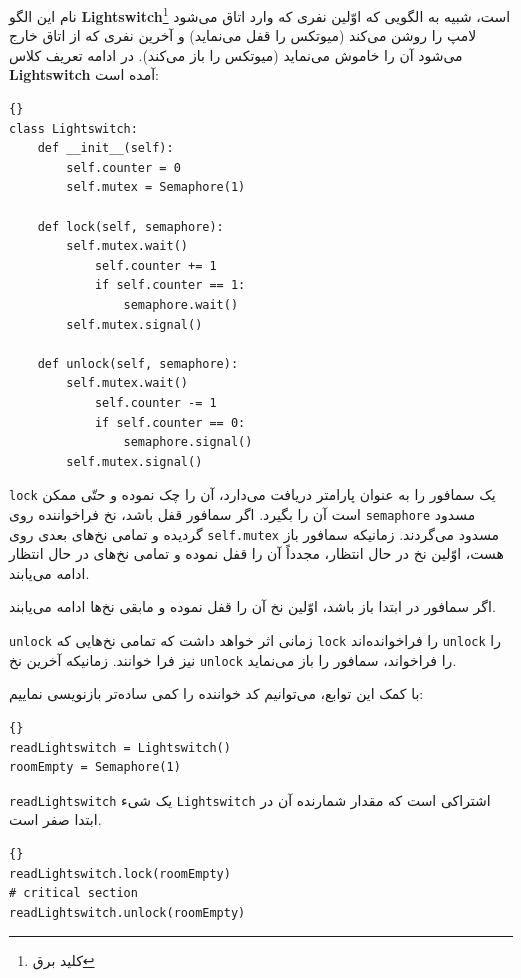 \documentclass{book}
\begin{document}
    نام این الگو {\bf Lightswitch}\footnote{کلید برق} است، شبیه به الگویی که اوّلین نفری که وارد اتاق می‌شود لامپ را روشن می‌کند  (میوتکس
    را قفل می‌نماید) و آخرین نفری که از اتاق خارج می‌شود آن را خاموش می‌نماید (میوتکس را باز می‌کند).
    در ادامه تعریف کلاس {\bf Lightswitch} آمده است: 
\begin{latin}
\begin{lstlisting}[title={\rl{تعریف} Lightswitch }]{}
class Lightswitch:
    def __init__(self):
        self.counter = 0
        self.mutex = Semaphore(1)

    def lock(self, semaphore):
        self.mutex.wait()
            self.counter += 1
            if self.counter == 1:
                semaphore.wait()
        self.mutex.signal()

    def unlock(self, semaphore):
        self.mutex.wait()
            self.counter -= 1
            if self.counter == 0:
                semaphore.signal()
        self.mutex.signal()
\end{lstlisting}
\end{latin}

    {\tt lock} 
    یک سمافور را به عنوان پارامتر دریافت می‌دارد، آن را چک نموده و حتّی ممکن است آن را بگیرد. 
    اگر سمافور قفل باشد، نخ فراخواننده روی  {\tt semaphore} مسدود گردیده و تمامی نخ‌های بعدی روی {\tt self.mutex} مسدود می‌گردند. 
    زمانیکه سمافور باز هست، اوّلین نخ در حال انتظار، مجدداً  آن را قفل نموده و تمامی نخ‌های در حال انتظار ادامه می‌یابند. 

    اگر سمافور در ابتدا باز باشد، اوّلین نخ آن را قفل نموده و مابقی نخ‌ها ادامه می‌یابند. 

{\tt unlock} 
    زمانی اثر خواهد داشت که تمامی نخ‌هایی که {\tt lock} را فراخوانده‌اند {\tt unlock} را نیز فرا خوانند.
    زمانیکه آخرین نخ {\tt unlock} را فراخواند، سمافور را باز می‌نماید. 

\newpage
    با کمک این توابع، می‌توانیم کد خواننده را کمی ساده‌تر بازنویسی نماییم: 

\begin{latin}
\begin{lstlisting}[title=\rl{مقداردهی اوّلیهٔ خوانندگان-نویسندگان}]{}
readLightswitch = Lightswitch()
roomEmpty = Semaphore(1)
\end{lstlisting}
\end{latin}

    {\tt readLightswitch} 
    یک شیء  {\tt Lightswitch} اشتراکی است که مقدار شمارنده آن در ابتدا صفر است. 


\begin{latin}
\begin{lstlisting}[title=\rl{راه‌حل خوانندگان-نویسندگان (خواننده)}]{}
readLightswitch.lock(roomEmpty)
# critical section
readLightswitch.unlock(roomEmpty)
\end{lstlisting}
\end{latin}
\end{document}
